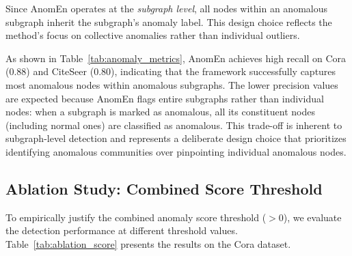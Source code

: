 \documentclass[10pt,twocolumn,a4paper]{article}
\begin{document}
Since AnomEn operates at the \textit{subgraph level}, all nodes within an anomalous subgraph inherit the subgraph's anomaly label. This design choice reflects the method's focus on collective anomalies rather than individual outliers.

\begin{table}[ht]
\centering
\caption{Anomaly Detection Performance with Synthetic Anomalies (5\% injection rate)}
\label{tab:anomaly_metrics}
\end{table}

As shown in Table~\ref{tab:anomaly_metrics}, AnomEn achieves high recall on Cora (0.88) and CiteSeer (0.80), indicating that the framework successfully captures most anomalous nodes within anomalous subgraphs. The lower precision values are expected because AnomEn flags entire subgraphs rather than individual nodes: when a subgraph is marked as anomalous, all its constituent nodes (including normal ones) are classified as anomalous. This trade-off is inherent to subgraph-level detection and represents a deliberate design choice that prioritizes identifying anomalous communities over pinpointing individual anomalous nodes.

\subsection{Ablation Study: Combined Score Threshold}

To empirically justify the combined anomaly score threshold ($> 0$), we evaluate the detection performance at different threshold values. Table~\ref{tab:ablation_score} presents the results on the Cora dataset.
\end{document}
